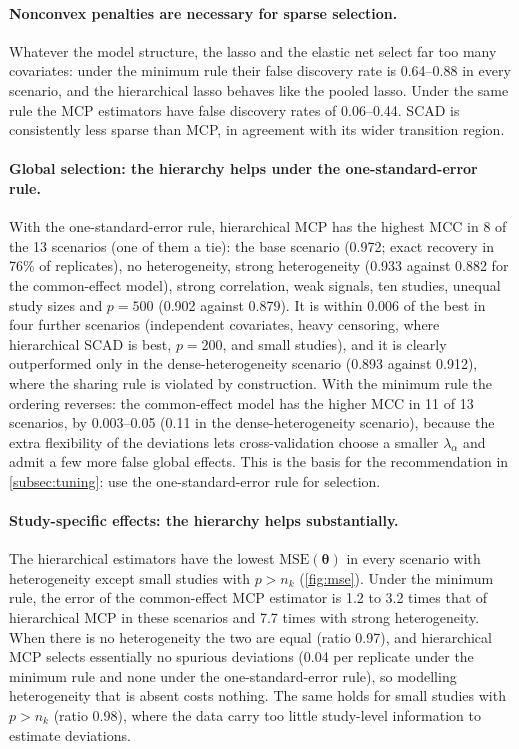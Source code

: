 \documentclass[11pt]{article}
\theoremstyle{remark}
\numberwithin{equation}{section}
\newcommand{\btheta}{\boldsymbol{\theta}}
\begin{document}
\paragraph{Nonconvex penalties are necessary for sparse selection.} Whatever the
model structure, the lasso and the elastic net select far too many covariates:
under the minimum rule their false discovery rate is 0.64--0.88 in every scenario,
and the hierarchical lasso behaves like the pooled lasso. Under the same rule the
MCP estimators have false discovery rates of 0.06--0.44. SCAD is consistently less
sparse than MCP, in agreement with its wider transition region.

\paragraph{Global selection: the hierarchy helps under the one-standard-error rule.}
With the one-standard-error rule, hierarchical MCP has the highest MCC in 8 of the
13 scenarios (one of them a tie): the base scenario (0.972; exact recovery in 76\%
of replicates), no heterogeneity, strong heterogeneity (0.933 against 0.882 for the
common-effect model), strong correlation, weak signals, ten studies, unequal study
sizes and $p=500$ (0.902 against 0.879). It is within 0.006 of the best in four
further scenarios (independent covariates, heavy censoring, where hierarchical SCAD
is best, $p=200$, and small studies), and it is clearly outperformed only in the
dense-heterogeneity scenario (0.893 against 0.912), where the sharing rule is
violated by construction. With the
minimum rule the ordering reverses: the common-effect model has the higher MCC in
11 of 13 scenarios, by 0.003--0.05 (0.11 in the dense-heterogeneity scenario), because the extra flexibility of the
deviations lets cross-validation choose a smaller $\lambda_\alpha$ and admit a few
more false global effects. This is the basis for the recommendation in
\cref{subsec:tuning}: use the one-standard-error rule for selection.

\paragraph{Study-specific effects: the hierarchy helps substantially.} The
hierarchical estimators have the lowest $\mathrm{MSE}(\btheta)$ in every scenario with
heterogeneity except small studies with $p>n_k$ (\cref{fig:mse}). Under the minimum
rule, the error of the common-effect MCP estimator is 1.2 to 3.2 times that of
hierarchical MCP in these scenarios and 7.7 times with strong heterogeneity. When there is no heterogeneity
the two are equal (ratio 0.97), and hierarchical MCP selects essentially no
spurious deviations (0.04 per replicate under the minimum rule and none under the
one-standard-error rule), so modelling heterogeneity that is absent costs nothing.
The same holds for small studies with $p>n_k$ (ratio 0.98), where the data carry
too little study-level information to estimate deviations.
\end{document}
